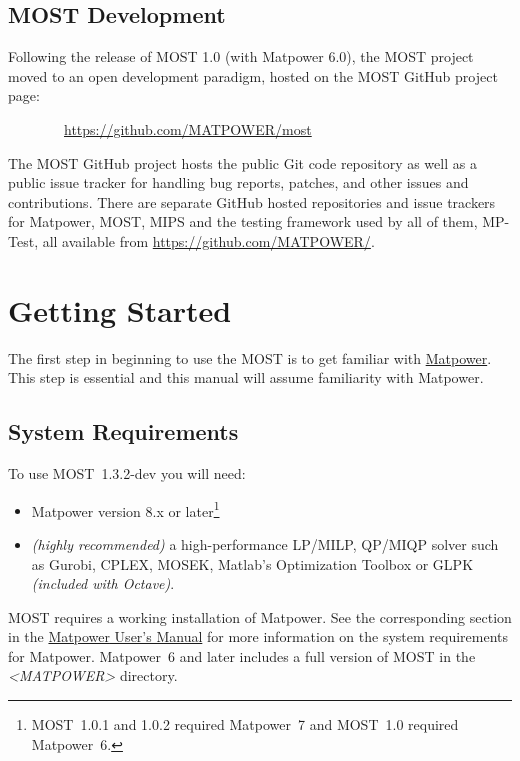 \documentclass[12pt]{article}
\newcommand{\mpver}[0]{8.1}
\newcommand{\matlab}[0]{{\sc Matlab}}
\newcommand{\matpower}[0]{{\sc Matpower}}
\newcommand{\matpowerurl}[0]{https://matpower.org}
\newcommand{\matpowerlink}[0]{\href{\matpowerurl}{\matpower{}}}
\newcommand{\mptest}[0]{{MP-Test}}
\newcommand{\mips}[0]{{MIPS}}
\newcommand{\most}[0]{{MOST}}
\newcommand{\mosturl}[0]{https://github.com/MATPOWER/most}
\newcommand{\mostver}[0]{1.3.2-dev}
\newcommand{\cplex}[0]{{CPLEX}}
\newcommand{\glpk}[0]{{GLPK}}
\newcommand{\gurobi}[0]{{Gurobi}}
\newcommand{\mosek}[0]{{MOSEK}}
\newcommand{\ot}[0]{{Optimization Toolbox}}
\newcommand{\code}[1]{{\relsize{-0.5}{\tt{{#1}}}}}  %
\newcommand{\mppath}[1]{\textsf{\textsl{{\relsize{-1.0}\textless{}\mbox{MATPOWER}\textgreater{}}}}\code{{#1}}}  %
\newcommand{\mostpath}[1]{\mppath{}\code{/most{#1}}}
\newcommand{\mumurl}[0]{https://matpower.org/docs/MATPOWER-manual-\mpver.pdf}
\newcommand{\mum}[0]{\href{\mumurl}{\matpower{} User's Manual}}
\numberwithin{equation}{section}
\numberwithin{table}{section}
\numberwithin{figure}{section}
\begin{document}
\subsection{\most{} Development}
\label{sec:development}

Following the release of \most{} 1.0 (with \matpower{} 6.0), the \most{} project moved to an open development paradigm, hosted on the \most{} GitHub project page:

\bigskip

~~~~~~~~\url{\mosturl}

\bigskip

The \most{} GitHub project hosts the public Git code repository as well as a public issue tracker for handling bug reports, patches, and other issues and contributions. There are separate GitHub hosted repositories and issue trackers for \matpower{}, \most{}, \mips{} and the testing framework used by all of them, \mptest{}, all available from \url{https://github.com/MATPOWER/}.


\clearpage
\section{Getting Started}

The first step in beginning to use the \most{} is to get familiar with \matpowerlink{}. This step is essential and this manual will assume familiarity with \matpower{}.

\subsection{System Requirements}
\label{sec:sysreq}
To use \most{}~\mostver{} you will need:
\begin{itemize}
\item \matpower{} version 8.x or later\footnote{\most{}~1.0.1 and 1.0.2 required \matpower{}~7 and \most{}~1.0 required \matpower{}~6.}
\item \emph{(highly recommended)} a high-performance LP/MILP, QP/MIQP solver such as \gurobi{}, \cplex{}, \mosek{}, \matlab{}'s \ot{} or \glpk{} \emph{(included with Octave)}.
\end{itemize}

\most{} requires a working installation of \matpower{}. See the corresponding section in the \mum{} for more information on the system requirements for \matpower{}.
\matpower{}~6 and later includes a full version of \most{} in the \mostpath{} directory.
\end{document}
